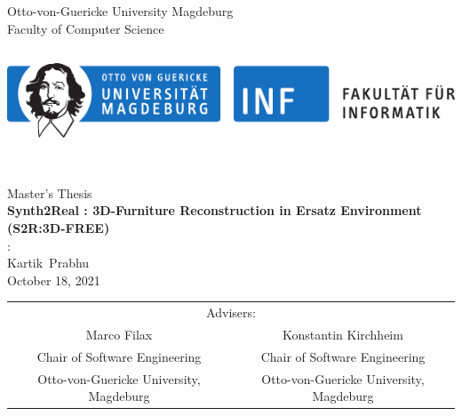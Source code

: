 \documentclass[
]{thesis}
\newcommand{\university}{Otto-von-Guericke University Magdeburg}
\newcommand{\school}{Faculty of Computer Science}
\newcommand{\logo}{\includegraphics[trim=0mm 0mm 50mm 0mm,clip,height=3cm]{ovgu}}
\newcommand{\advisorone}{Marco Filax}
\newcommand{\departmentone}{Chair of Software Engineering}
\newcommand{\universityone}{Otto-von-Guericke University, Magdeburg}
\newcommand{\advisortwo}{Konstantin Kirchheim}
\newcommand{\universitytwo}{Otto-von-Guericke University, Magdeburg}
\newcommand{\thesiskind}{Master's Thesis}
\newcommand{\theforename}{Kartik}
\newcommand{\thesurname}{Prabhu}
\newcommand{\thetitle}{Synth2Real : 3D-Furniture Reconstruction in Ersatz Environment \\ (S2R:3D-FREE)}
\newcommand{\thedate}{October 18, 2021}
\begin{document}
\frontmatter
\renewcommand{\proofname}{\itshape\biolinum{Proof}} %
\newcommand{\theauthor}{\theforename\ \thesurname}
\newcommand{\theauthorrev}{\thesurname,\ \theforename}
\graphicspath{{files/}}

\begin{titlepage}
    \thispagestyle{empty}
    \begin{center}
        {\university}\\[0.4cm]
        {\school}\\[2.0cm]
        \hbox{}\hfill
        \begin{minipage}[t]{\textwidth}
            \begin{center}
                \logo
            \end{center}
        \end{minipage}
        \hfill\hbox{}
        \ \\[0.4cm]
        {\large \thesiskind \\[1cm]}
        {\LARGE\bfseries\biolinum \thetitle \\[1cm]}
        {\iftoggle{german}{Autor}{Author}:}\\[0.4cm]
        {\large \theauthor}\\[0.8cm]
        {\large\thedate}\\[0.8cm]

    \vspace{2cm}
    \renewcommand{\arraystretch}{.9}
    \begin{tabular}{cc}
        \multicolumn{2}{c}{\small Advisers:} \\[1mm]
        {\large \advisorone} & {\large \advisortwo} \\[2mm]
        {\small \departmentone} 			 & {\small \departmentone} \\
        {\small \universityone} 			 & {\small \universitytwo} 	\\
    \end{tabular}

    \vspace{1cm}


\end{center}
\end{titlepage}
\end{document}

